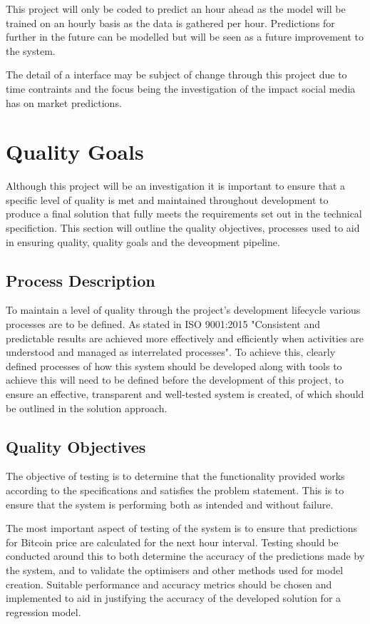 \documentclass[oneside, 12pt]{article}
\begin{document}
		This project will only be coded to predict an hour ahead as the model will be trained on an hourly basis as the data is gathered per hour. Predictions for further in the future can be modelled but will be seen as a future improvement to the system.
		
		The detail of a interface may be subject of change through this project due to time contraints and the focus being the investigation of the impact social media has on market predictions.
	
	\newpage
	\section{Quality Goals}
	Although this project will be an investigation it is important to ensure that a specific level of quality is met and maintained throughout development to produce a final solution that fully meets the requirements set out in the technical specifiction. This section will outline the quality objectives, processes used to aid in ensuring quality, quality goals and the deveopment pipeline.
	
	\subsection{Process Description}
	To maintain a level of quality through the project's development lifecycle various processes are to be defined. As stated in ISO 9001:2015 \cite{ISO9000} "Consistent and predictable results are achieved more effectively and efficiently when activities are understood and managed as interrelated processes". To achieve this, clearly defined processes of how this system should be developed along with tools to achieve this will need to be defined before the development of this project, to ensure an effective, transparent and well-tested system is created, of which should be outlined in the solution approach.
	
	\subsection{Quality Objectives}
	The objective of testing is to determine that the functionality provided works according to the specifications and satisfies the problem statement. This is to ensure that the system is performing both as intended and without failure.
	
	The most important aspect of testing of the system is to ensure that predictions for Bitcoin price are calculated for the next hour interval. Testing should be conducted around this to both determine the accuracy of the predictions made by the system, and to validate the optimisers and other methods used for model creation. Suitable performance and accuracy metrics should be chosen and implemented to aid in justifying the accuracy of the developed solution for a regression model.
	
\end{document}
